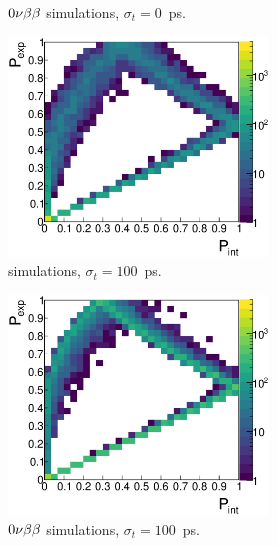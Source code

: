 \begin{figure}[!h]
\begin{subfigure}[t]{0.49\textwidth}
  \captionsetup{justification=justified}
  \caption{$0\nu\beta\beta$ simulations, ${\sigma_{t}=0}$~ps.
    \label{subfig:}}
\end{subfigure}
\begin{subfigure}[t]{0.49\textwidth}
  \centering
  \includegraphics[width=0.76\textwidth]{timedifference/fig_timediff/PintVSPexp_208Tl_100.eps}
  \captionsetup{justification=justified}
  \caption{\Tl simulations, ${\sigma_{t}=100}$~ps.
    \label{subfig:}}
\end{subfigure}
\hfill
\begin{subfigure}[t]{0.49\textwidth}
  \centering
  \includegraphics[width=0.76\textwidth]{timedifference/fig_timediff/PintVSPexp_0nubb_100.eps}
  \captionsetup{justification=justified}
  \caption{$0\nu\beta\beta$ simulations, ${\sigma_{t}=100}$~ps.
    \label{subfig:}}
\end{subfigure}
\begin{subfigure}[t]{0.49\textwidth}

\end{subfigure}
\end{figure}
